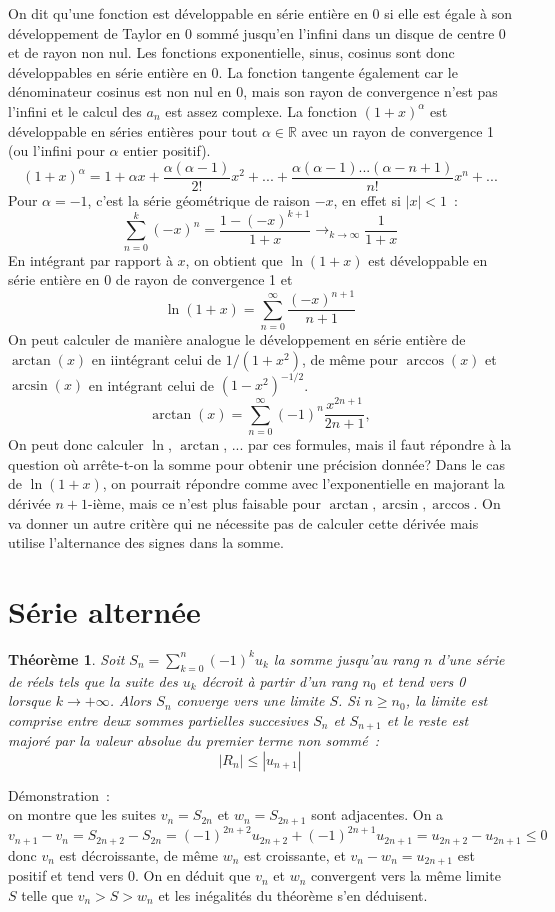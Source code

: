\documentclass[a4paper,11pt]{book}
\newtheorem{thm}{Théorème}
\begin{document}
\begin{giacjshere}
On dit qu'une fonction est développable en série entière en 0 si
elle est égale à son développement de Taylor en 0 sommé jusqu'en l'infini
dans un disque de centre 0 et de rayon non nul. Les fonctions
exponentielle, sinus, cosinus sont donc développables en série entière en 0.
La fonction tangente également car le dénominateur cosinus est non nul en 0,
mais son rayon de convergence n'est pas l'infini et le calcul des $a_n$
est assez complexe.
La fonction $(1+x)^\alpha$ est développable en séries entières
pour tout $\alpha \in \mathbb{R}$ avec un rayon de convergence 1 (ou l'infini
pour $\alpha $ entier positif). 
\[ (1+x)^\alpha = 1 + \alpha x + \frac{\alpha (\alpha-1)}{2!} x^2 +
... + \frac{\alpha (\alpha-1) ... (\alpha -n +1)}{n!} x^n + ...\]
Pour $\alpha=-1$, c'est la série 
géométrique de raison $-x$, en effet si $|x|<1$~:
\[ \sum_{n=0}^k (-x)^n = \frac{1-(-x)^{k+1}}{1+x} 
\rightarrow_{k\rightarrow \infty} \frac{1}{1+x}
\]
En intégrant par rapport à $x$, on obtient que $\ln(1+x)$ est développable
en série entière en 0 de rayon de convergence 1 et
\[ \ln(1+x) = \sum_{n=0}^\infty \frac{(-x)^{n+1}}{n+1} \]
On peut calculer de manière analogue le développement en série entière
de $\arctan(x)$ en iintégrant celui de $1/(1+x^2)$, de même pour $\arccos(x)$
et $\arcsin(x)$ en intégrant celui de $(1-x^2)^{-1/2}$.
\[ \arctan(x)=\sum_{n=0}^\infty (-1)^{n} \frac{x^{2n+1}}{2n+1},
\]
On peut donc calculer $\ln$, $\arctan$, ... par ces formules, 
mais il faut répondre
à la question où arrête-t-on la somme pour obtenir une précision donnée? 
Dans le cas de $\ln(1+x)$,
on pourrait répondre comme avec l'exponentielle en majorant la dérivée
$n+1$-ième, mais ce n'est plus faisable pour $\arctan, \arcsin, \arccos$.
On va donner un autre critère qui ne nécessite pas
de calculer cette dérivée mais utilise l'alternance des signes
dans la somme.

\section{Série alternée}
\begin{thm}
Soit $S_n= \sum_{k=0}^n (-1)^k u_k$ la somme jusqu'au rang $n$ d'une
s\'erie de r\'eels tels que la suite des $u_k$ d\'ecroit \`a partir
d'un rang $n_0$ et tend vers 0
lorsque $k\rightarrow +\infty$. Alors $S_n$ converge vers une limite
$S$. Si $n\geq n_0$, la limite est comprise entre deux sommes
partielles succesives $S_n$ et $S_{n+1}$ et le reste est major\'e par
la valeur absolue du premier terme non somm\'e~:
\[ |R_n| \leq |u_{n+1}|\]
\end{thm}
D\'emonstration~:\\
on montre que les suites $v_n=S_{2n}$ et $w_n=S_{2n+1}$ sont
adjacentes. On a 
\[ v_{n+1}-v_n= S_{2n+2}-S_{2n}= (-1)^{2n+2} u_{2n+2} + (-1)^{2n+1}
u_{2n+1} = u_{2n+2}-u_{2n+1} \leq 0\]
donc $v_n$ est d\'ecroissante, de m\^eme $w_n$ est croissante,
et $v_n-w_n=u_{2n+1}$ est positif et tend vers 0. On en d\'eduit que
$v_n$ et $w_n$ convergent vers la m\^eme limite $S$ telle que
$v_n>S>w_n$ et les in\'egalit\'es du th\'eor\`eme s'en d\'eduisent.


\end{giacjshere}
\end{document}
